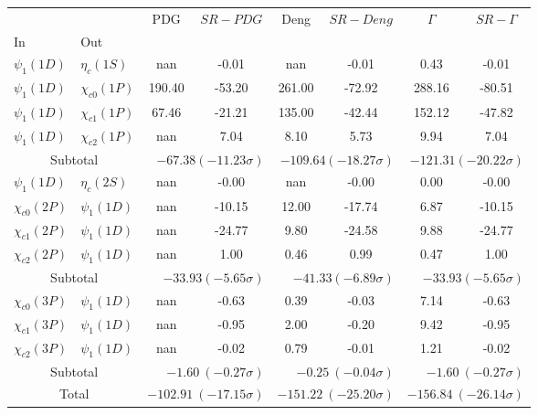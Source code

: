 \begin{tabular}{|l|l|c|c|c|c|c|c|}%
\hline%
&&PDG&$SR-PDG$&Deng&$SR-Deng$&$\Gamma$&$SR-\Gamma$\\%
In&Out&&&&&&\\%
\hline%
$\psi_{1}(1D)$&$\eta_{c}(1S)$&nan&-0.01&nan&-0.01&0.43&-0.01\\%
$\psi_{1}(1D)$&$\chi_{c0}(1P)$&190.40&-53.20&261.00&-72.92&288.16&-80.51\\%
$\psi_{1}(1D)$&$\chi_{c1}(1P)$&67.46&-21.21&135.00&-42.44&152.12&-47.82\\%
$\psi_{1}(1D)$&$\chi_{c2}(1P)$&nan&7.04&8.10&5.73&9.94&7.04\\%
\hline%
\hline%
\multicolumn{2}{|c|}{Subtotal}&\multicolumn{2}{|r|}{$-67.38 (-11.23\sigma)$}&\multicolumn{2}{|r|}{$-109.64 (-18.27\sigma)$}&\multicolumn{2}{|r|}{$-121.31 (-20.22\sigma)$}\\%
\hline%
\hline%
$\psi_{1}(1D)$&$\eta_{c}(2S)$&nan&-0.00&nan&-0.00&0.00&-0.00\\%
$\chi_{c0}(2P)$&$\psi_{1}(1D)$&nan&-10.15&12.00&-17.74&6.87&-10.15\\%
$\chi_{c1}(2P)$&$\psi_{1}(1D)$&nan&-24.77&9.80&-24.58&9.88&-24.77\\%
$\chi_{c2}(2P)$&$\psi_{1}(1D)$&nan&1.00&0.46&0.99&0.47&1.00\\%
\hline%
\hline%
\multicolumn{2}{|c|}{Subtotal}&\multicolumn{2}{|r|}{$-33.93 (-5.65\sigma)$}&\multicolumn{2}{|r|}{$-41.33 (-6.89\sigma)$}&\multicolumn{2}{|r|}{$-33.93 (-5.65\sigma)$}\\%
\hline%
\hline%
$\chi_{c0}(3P)$&$\psi_{1}(1D)$&nan&-0.63&0.39&-0.03&7.14&-0.63\\%
$\chi_{c1}(3P)$&$\psi_{1}(1D)$&nan&-0.95&2.00&-0.20&9.42&-0.95\\%
$\chi_{c2}(3P)$&$\psi_{1}(1D)$&nan&-0.02&0.79&-0.01&1.21&-0.02\\%
\hline%
\hline%
\multicolumn{2}{|c|}{Subtotal}&\multicolumn{2}{|r|}{$-1.60~(-0.27\sigma)$}&\multicolumn{2}{|r|}{$-0.25~(-0.04\sigma)$}&\multicolumn{2}{|r|}{$-1.60~(-0.27\sigma)$}\\%
\hline%
\hline%
\multicolumn{2}{|c|}{Total}&\multicolumn{2}{|r|}{$-102.91~(-17.15\sigma)$}&\multicolumn{2}{|r|}{$-151.22~(-25.20\sigma)$}&\multicolumn{2}{|r|}{$-156.84~(-26.14\sigma)$}\\%
\hline%
\end{tabular}